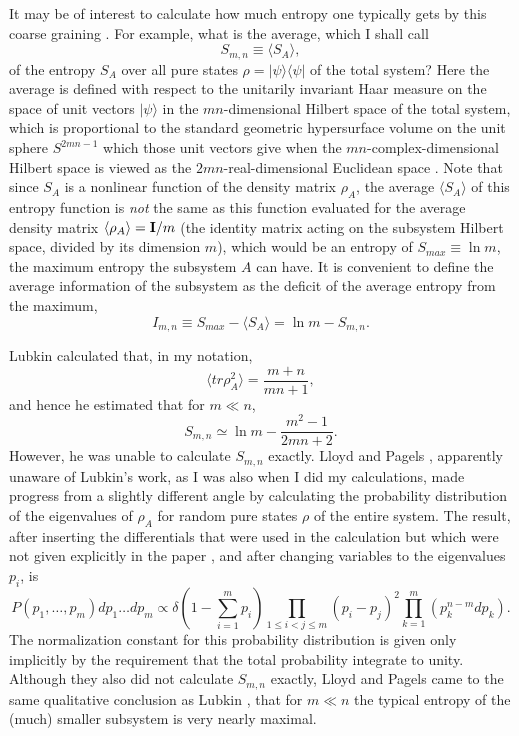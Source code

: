 It may be of interest to calculate how much entropy one typically
gets by this
coarse graining \cite{L1,LP,Pr,P}.  For example, what is the average,
which I
shall call
	\begin{equation}
	S_{m,n} \equiv \langle S_A\rangle,
	\end{equation}
of the entropy $S_A$ over all pure states $\rho =
|\psi\rangle\langle\psi|$ of
the total system?  Here the average is defined with respect to the
unitarily
invariant Haar measure on the space of unit vectors $|\psi\rangle$ in
the
$mn$-dimensional Hilbert space of the total system, which is
proportional to
the standard geometric hypersurface volume on the unit sphere
$S^{2mn-1}$ which
those unit vectors give when the $mn$-complex-dimensional Hilbert
space is
viewed as the $2mn$-real-dimensional Euclidean space \cite{L1}.  Note
that
since $S_A$ is a nonlinear function of the density matrix $\rho_A$,
the average
$\langle S_A\rangle$ of this entropy function is {\it not} the same
as this
function evaluated for the average density matrix
$\langle\rho_A\rangle = {\bf
I}/m$ (the identity matrix acting on the subsystem Hilbert space,
divided by
its dimension $m$), which would be an entropy of $S_{max} \equiv\ln
m$, the
maximum entropy the subsystem $A$ can have.  It is convenient to
define the
average information of the subsystem as the deficit of the average
entropy from
the maximum,
	\begin{equation}
	I_{m,n} \equiv S_{max} - \langle S_A\rangle = \ln m -
S_{m,n}.
	\end{equation}

Lubkin \cite{L1} calculated that, in my notation,
	\begin{equation}
	\langle tr\rho_A^2\rangle = \frac{m+n}{mn+1},
	\end{equation}
and hence he estimated that for $m\ll n$,
	\begin{equation}
	S_{m,n} \simeq \ln m - \frac{m^2-1}{2mn+2}.
	\end{equation}
However, he was unable to calculate $S_{m,n}$ exactly.  Lloyd and
Pagels
\cite{LP}, apparently unaware of Lubkin's work, as I was also when I
did my
calculations, made progress from a slightly different angle by
calculating the
probability distribution of the eigenvalues of $\rho_A$ for random
pure states
$\rho$ of the entire system.  The result, after inserting the
differentials
that were used in the calculation \cite{Lpri} but which were not
given
explicitly in the paper \cite{LP}, and after changing variables to
the
eigenvalues $p_i$, is
	\begin{equation}
	P(p_1,\ldots, p_m)dp_1 \ldots dp_m \propto
	\delta(1-\sum_{i=1}^{m}p_i)
	\prod_{1\leq i<j\leq m} (p_i-p_j)^2
	\prod_{k=1}^{m} (p_k^{n-m}dp_k).
	\end{equation}
The normalization constant for this probability distribution is given
only
implicitly by the requirement that the total probability integrate to
unity.
Although they also did not calculate $S_{m,n}$ exactly, Lloyd and
Pagels
\cite{LP} came to the same qualitative conclusion as Lubkin
\cite{L1}, that for
$m\ll n$ the typical entropy of the (much) smaller subsystem is very
nearly
maximal.

